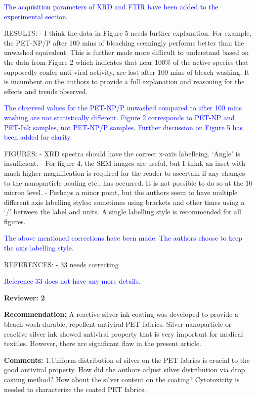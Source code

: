 \documentclass[12pt]{letter}
\newcommand{\blue}[1]{\textcolor{blue}{#1}} %
\begin{document}
\blue{The acquisition parameters of XRD and FTIR have been added to the experimental section.}

RESULTS:
- I think the data in Figure 5 needs further explanation. For example, the PET-NP/P after 100 mins of bleaching seemingly performs better than the unwashed equivalent. This is further made more difficult to understand based on the data from Figure 2 which indicates that near 100\% of the active species that supposedly confer anti-viral activity, are lost after 100 mins of bleach washing. It is incumbent on the authors to provide a full explanation and reasoning for the effects and trends observed.

\blue{ The observed values for the PET-NP/P unwashed compared to after 100 mins washing are not statistically different. Figure 2 corresponds to PET-NP and PET-Ink samples, not PET-NP/P samples. Further discussion on Figure 5 has been added for clarity.}

FIGURES:
- XRD spectra should have the correct x-axis labelleing. ‘Angle’ is insufficient.
- For figure 4, the SEM images are useful, but I think an inset with much higher magnification is required for the reader to ascertain if any changes to the nanoparticle loading etc., has occurred. It is not possible to do so at the 10 micron level.
- Perhaps a minor point, but the authors seem to have multiple different axis labelling styles; sometimes using brackets and other times using a ‘/’ between the label and units. A single labelling style is recommended for all figures.

\blue{The above mentioned corrections have been made. The authors choose to keep the axis labelling style. }


REFERENCES:
- 33 needs correcting

\blue{Reference 33 does not have any more details. }

\newpage
\textbf{Reviewer: 2}

\textbf{Recommendation:} A reactive silver ink coating was developed to provide a bleach wash durable, repellent antiviral PET fabrics. Silver nanoparticle or reactive silver ink showed antiviral property that is very important for medical textiles. However, there are significant flaw in the present article.

\textbf{Comments:} 
1.Uniform distribution of silver on the PET fabrics is crucial to the good antiviral property. How did the authors adjust silver distribution via drop casting method? How about the silver content on the coating? Cytotoxicity is needed to characterize the coated PET fabrics.
\end{document}
